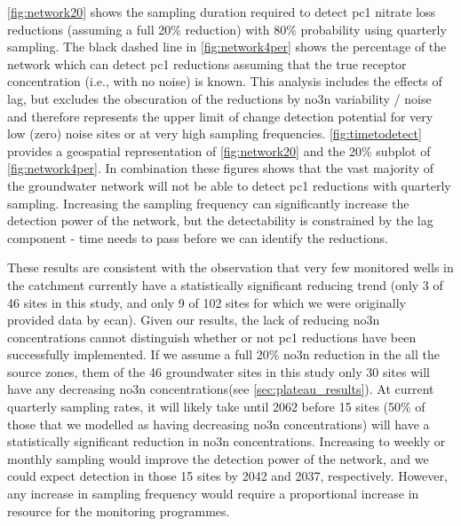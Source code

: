 \autoref{fig:network20} shows the sampling duration required to detect \gls{pc1} nitrate loss reductions (assuming a full 20\% reduction) with 80\% probability using quarterly sampling.
The black dashed line in \autoref{fig:network4per} shows the percentage of the network which can detect \gls{pc1} reductions assuming that the true receptor concentration (i.e., with no noise) is known.
This analysis includes the effects of lag, but excludes the obscuration of the reductions by \gls{no3n} variability / noise and therefore represents the upper limit of change detection potential for very low (zero) noise sites or at very high sampling frequencies.
\autoref{fig:timetodetect} provides a geospatial representation of \autoref{fig:network20} and the 20\% subplot of \autoref{fig:network4per}.
In combination these figures shows that the vast majority of the groundwater network will not be able to detect \gls{pc1} reductions with quarterly sampling.
Increasing the sampling frequency can significantly increase the detection power of the network, but the detectability is constrained by the lag component - time needs to pass before we can identify the reductions.

These results are consistent with the observation that very few monitored wells in the catchment currently have a statistically significant reducing trend (only 3 of 46 sites in this study, and only 9 of 102 sites for which we were originally provided data by \gls{ecan}).
Given our results, the lack of reducing \gls{no3n} concentrations cannot distinguish whether or not \gls{pc1} reductions have been successfully implemented.
If we assume a full 20\% \gls{no3n} reduction in the all the source zones, them of the 46 groundwater sites in this study only 30 sites will have any decreasing \gls{no3n} concentrations(see \autoref{sec:plateau_results}).
At current quarterly sampling rates, it will likely take until 2062 before 15 sites (50\% of those that we modelled as having decreasing \gls{no3n} concentrations) will have a statistically significant reduction in \gls{no3n} concentrations.
Increasing to weekly or monthly sampling would improve the detection power of the network, and we could expect detection in those 15 sites by 2042 and 2037, respectively.
However, any increase in sampling frequency would require a proportional increase in resource for the monitoring programmes.

